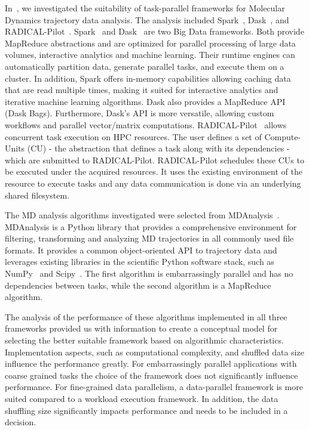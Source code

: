 In~\cite{paraskevakos2018task}, we investigated the suitability of task-parallel 
frameworks for Molecular Dynamics trajectory data analysis. The analysis included 
Spark~\cite{zaharia2010spark}, Dask~\cite{rocklin2015dask}, and RADICAL-Pilot~\cite{merzky2019using}. 
Spark~\cite{zaharia2010spark} and Dask~\cite{rocklin2015dask} are two Big Data 
frameworks. Both provide MapReduce abstractions and are optimized for parallel 
processing of large data volumes, interactive analytics and machine learning. Their 
runtime engines can automatically partition data, generate parallel tasks, and 
execute them on a cluster. In addition, Spark offers in-memory capabilities allowing 
caching data that are read multiple times, making it suited for interactive 
analytics and iterative machine learning algorithms. Dask also provides a MapReduce 
API (Dask Bags). Furthermore, Dask’s API is more versatile, allowing custom 
workflows and parallel vector/matrix computations. RADICAL-Pilot~\cite{merzky2019using} 
allows concurrent task execution on HPC resources. The user defines a set of 
Compute-Units (CU) - the abstraction that defines a task along with its dependencies - 
which are submitted to RADICAL-Pilot. RADICAL-Pilot schedules these CUs to be 
executed under the acquired resources. It uses the existing environment of the 
resource to execute tasks and any data communication is done via an underlying 
shared filesystem.

The MD analysis algorithms investigated were selected from MDAnalysis~\cite{gowers2016mdanalysis,michaud2011mdanalysis}.
 MDAnalysis is a Python library that provides a comprehensive environment for 
 filtering, transforming and analyzing MD trajectories in all commonly used file 
 formats. It provides a common object-oriented API to trajectory data and leverages 
 existing libraries in the scientific Python software stack, such as NumPy~\cite{numpy} 
 and Scipy~\cite{scipy}. The first algorithm is embarrassingly parallel and has 
 no dependencies between tasks, while the second algorithm is a MapReduce 
 algorithm.

The analysis of the performance of these algorithms implemented in all three 
frameworks provided us with information to create a conceptual model for selecting 
the better suitable framework based on algorithmic characteristics. Implementation 
aspects, such as computational complexity, and shuffled data size influence the 
performance greatly. For embarrassingly parallel applications with coarse grained 
tasks the choice of the framework does not significantly influence performance. 
For fine-grained data parallelism, a data-parallel framework is more suited compared 
to a workload execution framework. In addition, the data shuffling size significantly 
impacts performance and needs to be included in a decision.

